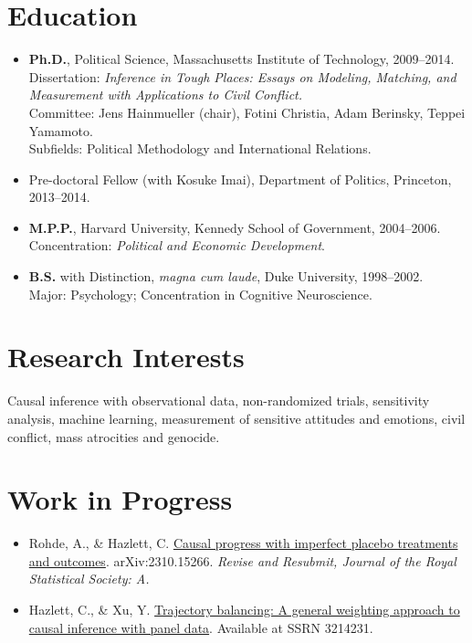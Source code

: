 \documentclass[11pt]{article}
\begin{document}
\section{Education}
\begin{itemize}
\item \textbf{Ph.D.}, Political Science, Massachusetts Institute of Technology, 2009--2014.\\
  Dissertation: \emph{Inference in Tough Places: Essays on Modeling, Matching, and Measurement with Applications to Civil Conflict.}\\
  Committee: Jens Hainmueller (chair), Fotini Christia, Adam Berinsky, Teppei Yamamoto.\\
  Subfields: Political Methodology and International Relations.
\item Pre-doctoral Fellow (with Kosuke Imai), Department of Politics, Princeton, 2013--2014.
\item \textbf{M.P.P.}, Harvard University, Kennedy School of Government, 2004--2006.\\
  Concentration: \emph{Political and Economic Development}.
\item \textbf{B.S.} with Distinction, \textit{magna cum laude}, Duke University, 1998--2002.\\
  Major: Psychology; Concentration in Cognitive Neuroscience.
\end{itemize}

\section{Research Interests}
Causal inference with observational data, non-randomized trials, sensitivity analysis, machine learning, measurement of sensitive attitudes and emotions, civil conflict, mass atrocities and genocide.

\section{Work in Progress}
\begin{itemize}
\item Rohde, A., \& Hazlett, C. \href{https://chadhazlett.com/publications.html#rohde_hazlett_placebo}{Causal progress with imperfect placebo treatments and outcomes}. arXiv:2310.15266. \emph{Revise and Resubmit, Journal of the Royal Statistical Society: A.}
\item Hazlett, C., \& Xu, Y. \href{https://chadhazlett.com/publications.html#hazlett_xu_trajectory}{Trajectory balancing: A general weighting approach to causal inference with panel data}. Available at SSRN 3214231.
\end{itemize}
\end{document}
